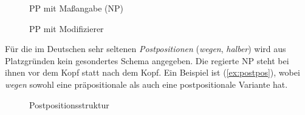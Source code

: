 \begin{exe}
  \ex\label{ex:prpgrallg}
  \begin{xlist}
  \end{xlist}
\end{exe}

\begin{figure}[!htbp]
  \centering
  \caption{PP mit Maßangabe (NP)}
  \label{fig:prpgrmitakkmod}
\end{figure}

\begin{figure}[!htbp]
  \centering
  \caption{PP mit Modifizierer}
  \label{fig:prpgrmitadvmod}
\end{figure}


Für die im Deutschen sehr seltenen \textit{Postpositionen} (\zB \textit{wegen}, \textit{halber}) wird aus Platzgründen kein gesondertes Schema angegeben.
Die regierte NP steht bei ihnen vor dem Kopf statt nach dem Kopf.
Ein Beispiel ist (\ref{ex:postpos}), wobei \textit{wegen} sowohl eine präpositionale als auch eine postpositionale Variante hat.

\begin{exe}
\end{exe}

\begin{figure}[!htbp]
  \centering
  \caption{Postpositionsstruktur}
  \label{fig:postpos}
\end{figure}

